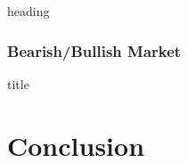 \documentclass[12pt, a4paper]{article}
\begin{document}
		\begin{table}[htbp]
			\centering
			\caption{heading}
			\label{BigBusinessGroup}
			\resizebox{0.7\textwidth}{!}{
				
			}
		\end{table}




\subsubsection{Bearish/Bullish Market}{}
	\begin{table}[htbp]
		\centering
		\caption{title}
		\label{mresult2Down}
		\resizebox{1\textwidth}{!}{
			
		}
	\end{table}

\FloatBarrier

\section{Conclusion}



\newpage
\footnotesize{
	
	
}
\end{document}
